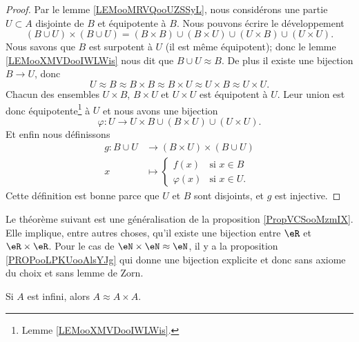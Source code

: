 \begin{proof}
	Par le lemme \ref{LEMooMRVQooUZSSyL}, nous considérons une partie \( U\subset A\) disjointe de \( B\) et équipotente à \( B\). Nous pouvons écrire le développement
	\begin{equation}
		(B\cup U)\times (B\cup U)=(B\times B)\cup(B\times U)\cup (U\times B)\cup (U\times U).
	\end{equation}
	Nous savons que \( B\) est surpotent à \( U\) (il est même équipotent); donc le lemme \ref{LEMooXMVDooIWLWis} nous dit que \( B\cup U\approx B\). De plus il existe une bijection \( B\to U\), donc
	\begin{equation}
		U\approx B\approx B\times B\approx B\times U\approx U\times B\approx U\times U.
	\end{equation}
	Chacun des ensembles  \( U\times B\),  \( B\times U\) et \( U\times U\) est équipotent à \( U\). Leur union est donc équipotente\footnote{Lemme \ref{LEMooXMVDooIWLWis}.}
	à \( U\) et nous avons une bijection
	\begin{equation}
		\varphi\colon U\to U\times B\cup (B\times U)\cup (U\times U).
	\end{equation}
	Et enfin nous définissons
	\begin{equation}
		\begin{aligned}
			g\colon B\cup U & \to (B\times U)\times (B\cup U)         \\
			x               & \mapsto \begin{cases}
				                          f(x)       & \text{si }  x\in B \\
				                          \varphi(x) & \text{si } x\in U.
			                          \end{cases}
		\end{aligned}
	\end{equation}
	Cette définition est bonne parce que \( U\) et \( B\) sont disjoints, et \( g\) est injective.
\end{proof}

Le théorème suivant est une généralisation de la proposition \ref{PropVCSooMzmIX}. Elle implique, entre autres choses, qu'il existe une bijection entre \( \eR\) et \( \eR\times \eR\). Pour le cas de \( \eN\times \eN\approx \eN\), il y a la proposition \ref{PROPooLPKUooAlsYJg} qui donne une bijection explicite et donc sans axiome du choix et sans lemme de Zorn.
\begin{theorem}     \label{THOooDGOVooRdURVi}
	Si \( A\) est infini, alors \( A\approx A\times A\).
\end{theorem}

